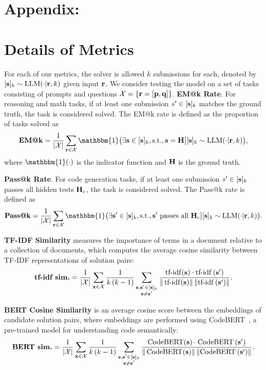 \section*{\centering \Large{Appendix: \modelname}}



\section{Details of Metrics}\label{metrics}
 
For each of our metrics, the solver is allowed $k$ submissions for each, denoted by $[\mathbf{s}]_k \sim \text{LLM} (\cdot | \mathbf{r}, k)$ given input $\mathbf{r}$. We consider testing the model on a set of tasks consisting of prompts and questions $\mathcal{X} = \{ \mathbf{r} = [\mathbf{p}, \mathbf{q}] \}$. 
\textbf{EM@k Rate}.
For reasoning and math tasks, if at least one submission $s'\in [\mathbf{s}]_k$ matches the ground truth, the task is considered solved. The EM@k rate is defined as the proportion of tasks solved as
$$
\textbf{EM@k} = \frac{1}{|\mathcal{X}|} \sum_{\vr \in \tX} \mathbbm{1} \big(\exists \vs \in [\vs]_k, \text{s.t.}, \vs=\mH \big| [\vs]_k \sim \text{LLM} (\cdot | \vr, k) \big),
$$
where $\mathbbm{1}(\cdot)$ is the indicator function and $\mathbf{H}$ is the ground truth. 

\textbf{Pass@k Rate}.
For code generation tasks, if at least one submission $s'\in [\mathbf{s}]_k$ passes all hidden tests $\mathbf{H}_c$, the task is considered solved. The Pass@k rate is defined as
$$
\textbf{Pass@k} = \frac{1}{|\mathcal{X}|} \sum_{\vr \in \tX} \mathbbm{1} \big( \exists \vs' \in [\vs]_k, \text{s.t.}, \vs' \text{ passes all } \mH_c \big| [\vs]_k \sim \text{LLM} (\cdot | \vr, k) \big). 
$$

\textbf{TF-IDF Similarity} measures the importance of terms in a document relative to a collection of documents, which computes the average cosine similarity between TF-IDF representations of solution pairs: 
$$
\textbf{tf-idf sim.} = \frac{1}{|\mathcal{X}|} \sum_{\mathbf{x} \in \mathcal{X}} \frac{1}{k\left(k-1\right)} \sum_{\substack{{\mathbf{s}}, {\mathbf{s}}^{\prime} \in [\mathbf{s}]_k \\ {\mathbf{s}} \neq {\mathbf{s}}^{\prime}}} \frac{\operatorname{tf-idf}({\mathbf{s}}) \cdot \operatorname{tf-idf}\left(\mathbf{s}^{\prime}\right)}{\|\operatorname{tf-idf}({\mathbf{s}})\|\left\|\operatorname{tf-idf}\left({\mathbf{s}}^{\prime}\right)\right\|}.
$$

\textbf{BERT Cosine Similarity} is an average cosine score between the embeddings of candidate solution pairs, where embeddings are performed using CodeBERT~\cite{feng2020codebert}, a pre-trained model for understanding code semantically: 
$$
\textbf{BERT sim.} = \frac{1}{|\mathcal{X}|} \sum_{\mathbf{x} \in \mathcal{X}} \frac{1}{k\left(k-1\right)} \sum_{\substack{{\mathbf{s}}, {\mathbf{s}}^{\prime} \in [\mathbf{s}]_k \\ {\mathbf{s}} \neq {\mathbf{s}}^{\prime}}} \frac{\operatorname{CodeBERT}({\mathbf{s}}) \cdot \operatorname{CodeBERT}\left({\mathbf{s}}^{\prime}\right)}{\|\operatorname{CodeBERT}({\mathbf{s}})\|\left\|\operatorname{CodeBERT}\left({\mathbf{s}}^{\prime}\right)\right\|}.
$$


